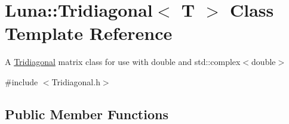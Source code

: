 \hypertarget{classLuna_1_1Tridiagonal}{}\section{Luna\+:\+:Tridiagonal$<$ T $>$ Class Template Reference}
\label{classLuna_1_1Tridiagonal}


A \hyperlink{classLuna_1_1Tridiagonal}{Tridiagonal} matrix class for use with double and std\+::complex$<$double$>$  




{\ttfamily \#include $<$Tridiagonal.\+h$>$}

\subsection*{Public Member Functions}
